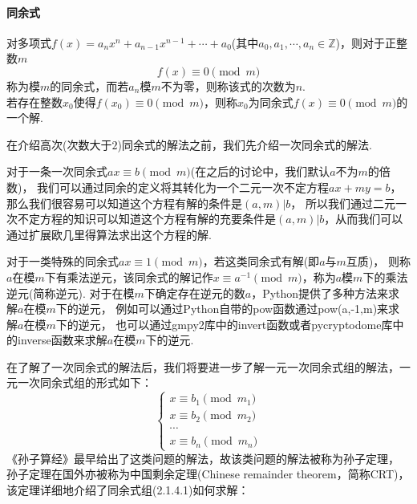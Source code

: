 \documentclass{article}
\numberwithin{equation}{subsubsection}
\begin{document}
\paragraph{\textbf{同余式}}
对多项式$f(x)=a_nx^n+a_{n-1}x^{n-1}+\cdots+a_0$(其中$a_0,a_1,\cdots,a_n\in\mathbb{Z}$)，则对于正整数$m$
\begin{equation}
    f(x)\equiv 0\pmod{m}
    \nonumber
\end{equation}
称为模$m$的同余式，而若$a_n$模$m$不为零，则称该式的次数为$n$.\\
若存在整数$x_0$使得$f(x_0)\equiv 0\pmod{m}$，则称$x_0$为同余式$f(x)\equiv 0\pmod{m}$的一个解.\par
在介绍高次(次数大于$2$)同余式的解法之前，我们先介绍一次同余式的解法.\par
对于一条一次同余式$ax\equiv b\pmod{m}$(在之后的讨论中，我们默认$a$不为$m$的倍数)，
我们可以通过同余的定义将其转化为一个二元一次不定方程$ax+my=b$，那么我们很容易可以知道这个方程有解的条件是$(a,m)|b$，
所以我们通过二元一次不定方程的知识可以知道这个方程有解的充要条件是$(a,m)|b$，从而我们可以通过扩展欧几里得算法求出这个方程的解.\par
对于一类特殊的同余式$ax\equiv 1\pmod{m}$，若这类同余式有解(即$a$与$m$互质)，
则称$a$在模$m$下有乘法逆元，该同余式的解记作$x\equiv a^{-1}\pmod{m}$，称为$a$模$m$下的乘法逆元(简称逆元).
对于在模$m$下确定存在逆元的数$a$，Python提供了多种方法来求解$a$在模$m$下的逆元，
例如可以通过Python自带的pow函数通过pow(a,-1,m)来求解$a$在模$m$下的逆元，
也可以通过gmpy2库中的invert函数或者pycryptodome库中的inverse函数来求解$a$在模$m$下的逆元.\par
在了解了一次同余式的解法后，我们将要进一步了解一元一次同余式组的解法，一元一次同余式组的形式如下：
\begin{equation}
    \begin{cases}
        x\equiv b_1\pmod{m_1}\\
        x\equiv b_2\pmod{m_2}\\
        \cdots\\
        x\equiv b_n\pmod{m_n}
    \end{cases}
\end{equation}
《孙子算经》最早给出了这类问题的解法，故该类问题的解法被称为孙子定理，
孙子定理在国外亦被称为中国剩余定理(Chinese remainder theorem，简称CRT)，
该定理详细地介绍了同余式组(2.1.4.1)如何求解：
\end{document}
